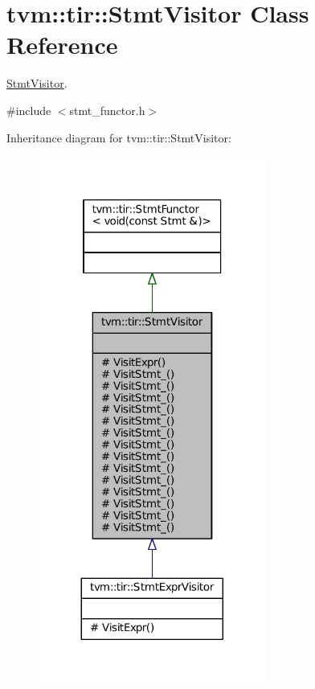 \hypertarget{classtvm_1_1tir_1_1StmtVisitor}{}\section{tvm\+:\+:tir\+:\+:Stmt\+Visitor Class Reference}
\label{classtvm_1_1tir_1_1StmtVisitor}


\hyperlink{classtvm_1_1tir_1_1StmtVisitor}{Stmt\+Visitor}.  




{\ttfamily \#include $<$stmt\+\_\+functor.\+h$>$}



Inheritance diagram for tvm\+:\+:tir\+:\+:Stmt\+Visitor\+:
\nopagebreak
\begin{figure}[H]
\begin{center}
\leavevmode
\includegraphics[width=212pt]{classtvm_1_1tir_1_1StmtVisitor__inherit__graph}
\end{center}
\end{figure}


